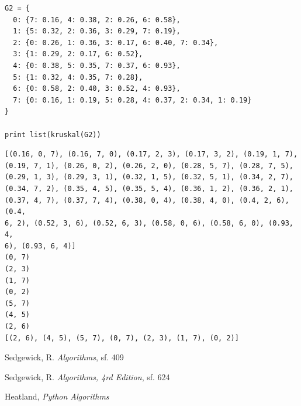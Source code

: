 \documentclass[12pt,fleqn]{article}\usepackage{../common}
\begin{document}
\begin{verbatim}
G2 = {
  0: {7: 0.16, 4: 0.38, 2: 0.26, 6: 0.58},
  1: {5: 0.32, 2: 0.36, 3: 0.29, 7: 0.19},
  2: {0: 0.26, 1: 0.36, 3: 0.17, 6: 0.40, 7: 0.34},
  3: {1: 0.29, 2: 0.17, 6: 0.52},
  4: {0: 0.38, 5: 0.35, 7: 0.37, 6: 0.93},
  5: {1: 0.32, 4: 0.35, 7: 0.28},
  6: {0: 0.58, 2: 0.40, 3: 0.52, 4: 0.93},
  7: {0: 0.16, 1: 0.19, 5: 0.28, 4: 0.37, 2: 0.34, 1: 0.19}
} 

print list(kruskal(G2))
\end{verbatim}

\begin{verbatim}
[(0.16, 0, 7), (0.16, 7, 0), (0.17, 2, 3), (0.17, 3, 2), (0.19, 1, 7),
(0.19, 7, 1), (0.26, 0, 2), (0.26, 2, 0), (0.28, 5, 7), (0.28, 7, 5),
(0.29, 1, 3), (0.29, 3, 1), (0.32, 1, 5), (0.32, 5, 1), (0.34, 2, 7),
(0.34, 7, 2), (0.35, 4, 5), (0.35, 5, 4), (0.36, 1, 2), (0.36, 2, 1),
(0.37, 4, 7), (0.37, 7, 4), (0.38, 0, 4), (0.38, 4, 0), (0.4, 2, 6), (0.4,
6, 2), (0.52, 3, 6), (0.52, 6, 3), (0.58, 0, 6), (0.58, 6, 0), (0.93, 4,
6), (0.93, 6, 4)] 
(0, 7)
(2, 3)
(1, 7)
(0, 2)
(5, 7)
(4, 5)
(2, 6)
[(2, 6), (4, 5), (5, 7), (0, 7), (2, 3), (1, 7), (0, 2)]
\end{verbatim}


















Sedgewick, R. {\em Algorithms}, sf. 409

Sedgewick, R. {\em Algorithms, 4rd Edition}, sf. 624

Heatland, {\em Python Algorithms}
\end{document}

